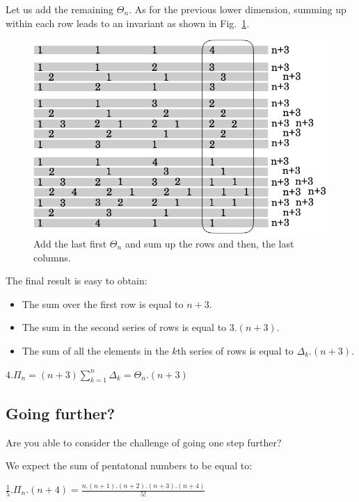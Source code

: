 Let us add the remaining $\Theta_n$.
As for the previous lower dimension, summing up within each row leads to an invariant as shown in Fig.~\ref{fig:Tetrahedral5}.
\begin{figure}[h]
\begin{center}
        \includegraphics[scale=0.36]{FiguresArithmetic/appTetrahedral5}
        \caption{Add the last first $\Theta_n$ and sum up the rows and then, the last columns.}
        \label{fig:Tetrahedral5}
\end{center}
\end{figure}
The final result is easy to obtain:
\begin{itemize}
\item 
The sum over the first row is equal to $n+3$.
\item
The sum in the second series of rows is equal to $3.(n+3)$. 
\item
The sum of all the elements in the $k$th series of rows is equal to
$\Delta_k.(n+3)$.
\end{itemize}
$4.\Pi_n = (n+3) \sum_{k=1}^{n} \Delta_k = \Theta_n.(n+3)$


\subsection{Going further?}

Are you able to consider the challenge of going one step further?

We expect the sum of pentatonal numbers to be equal to:

$\frac{1}{5}.\Pi_n.(n+4) = \frac{n.(n+1).(n+2).(n+3).(n+4)}{5!}$



